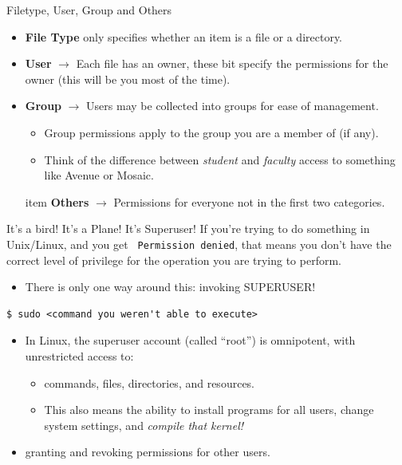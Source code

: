 \documentclass[11pt]{beamer}
\begin{document}
\begin{frame}{Filetype, User, Group and Others}
\begin{itemize}
\item \textbf{File Type} only specifies whether an item is a file or a directory.
\item \textbf{User} $\rightarrow$ Each file has an owner, these bit specify the permissions for the owner (this will be you most of the time).
\item \textbf{Group} $\rightarrow$ Users may be collected into groups for ease of management. 
\begin{itemize}
\item Group permissions apply to the group you are a member of (if any).
\item Think of the difference between \emph{student} and \emph{faculty} access to something like Avenue or Mosaic.  
\end{itemize}
item \textbf{Others} $\rightarrow$ Permissions for everyone not in the first two categories.  
\end{itemize}
\end{frame}

\begin{frame}[fragile=singleslide]{It's a bird! It's a Plane! It's Superuser!}
If you're trying to do something in Unix/Linux, and you get \texttt{ Permission denied}, that means you don't have the correct level of privilege for the operation you are trying to perform.
	\begin{itemize}
	\item There is only one way around this: invoking SUPERUSER!
	\end{itemize}
\begin{lstlisting}[style=terminal]
$ sudo <command you weren't able to execute>
\end{lstlisting}
	\begin{itemize}
	\item In Linux, the superuser account (called ``root'') is omnipotent, with unrestricted access to:
		\begin{itemize}
		\item commands, files, directories, and resources.
		\item This also means the ability to install programs for all users, change system settings, and \emph{compile that kernel!}
		\end{itemize}
	\item granting and revoking permissions for other users.
	\end{itemize}
\end{frame}
\end{document}
